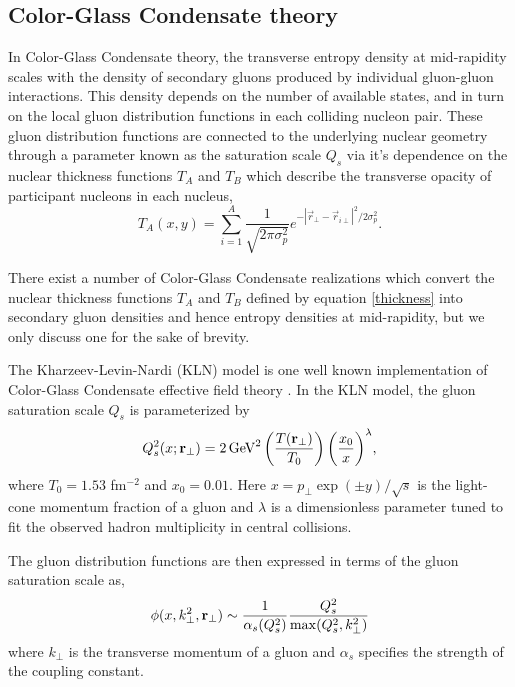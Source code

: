 \documentclass[aps,prc,reprint,amsmath,nofootinbib]{revtex4-1}
\begin{document}
\subsection{Color-Glass Condensate theory}

In Color-Glass Condensate theory, the transverse entropy density at mid-rapidity scales with the density of secondary gluons produced by individual gluon-gluon interactions.
This density depends on the number of available states, and in turn on the local gluon distribution functions in each colliding nucleon pair. These gluon distribution 
functions are connected to the underlying nuclear geometry through a parameter known as the saturation scale $Q_s$ via it's dependence on the nuclear thickness 
functions $T_{A}$ and $T_{B}$ which describe the transverse opacity of participant nucleons in each nucleus,
\begin{equation}
 \label{thickness}
 T_A(x,y) = \sum\limits_{i=1}^{A} \frac{1}{\sqrt{2 \pi \sigma^2_p}} e^{ -|\vec{r}_\perp-\vec{r}_{i\perp}|^2/2 \sigma_{p}^2 }.  
\end{equation}

There exist a number of Color-Glass Condensate realizations which convert the nuclear thickness functions $T_{A}$ and $T_{B}$ defined by equation \ref{thickness} into 
secondary gluon densities and hence entropy densities at mid-rapidity, but we only discuss one for the sake of brevity.

The Kharzeev-Levin-Nardi (KLN) model is one well known implementation of Color-Glass Condensate effective field theory \cite{KLN}. In the KLN model, the gluon saturation scale 
$Q_s$ is parameterized by
\begin{equation}
 Q^2_s(x;{\bf r}_\perp) = 2\, \mbox{GeV}^2 \left( \frac{T({\bf r}_\perp)}{T_0} \right) \bigg( \frac{x_0}{x} \bigg)^\lambda,
\end{equation}
where $T_0=1.53$ fm$^{-2}$ and $x_0 = 0.01$. Here $x=p_\perp \exp(\pm y)/\sqrt{s}$ is the light-cone momentum fraction of a gluon and $\lambda$ is a 
dimensionless parameter tuned to fit the observed hadron multiplicity in central collisions.
 
The gluon distribution functions are then expressed in terms of the gluon saturation scale as,
\begin{equation}
 \phi(x,k^2_\perp,{\bf r}_\perp) \sim \frac{1}{\alpha_s(Q_s^2)}\frac{Q_s^2}{\max(Q_s^2,k_\perp^2)}
\end{equation}
where $k_\perp$ is the transverse momentum of a gluon and $\alpha_s$ specifies the strength of the coupling constant. 
\end{document}
